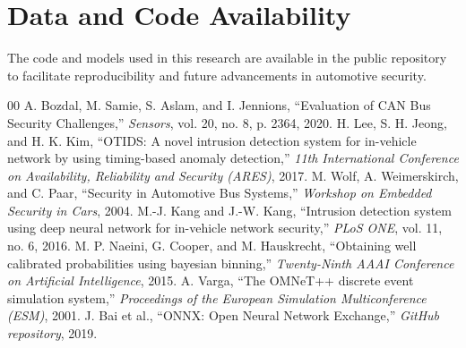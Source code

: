 \documentclass[conference]{IEEEtran}
\begin{document}
\section{Data and Code Availability}
The code and models used in this research are available in the public repository to facilitate reproducibility and future advancements in automotive security.

\begin{thebibliography}{00}
 A. Bozdal, M. Samie, S. Aslam, and I. Jennions, ``Evaluation of CAN Bus Security Challenges,'' \emph{Sensors}, vol. 20, no. 8, p. 2364, 2020.
 H. Lee, S. H. Jeong, and H. K. Kim, ``OTIDS: A novel intrusion detection system for in-vehicle network by using timing-based anomaly detection,'' \emph{11th International Conference on Availability, Reliability and Security (ARES)}, 2017.
 M. Wolf, A. Weimerskirch, and C. Paar, ``Security in Automotive Bus Systems,'' \emph{Workshop on Embedded Security in Cars}, 2004.
 M.-J. Kang and J.-W. Kang, ``Intrusion detection system using deep neural network for in-vehicle network security,'' \emph{PLoS ONE}, vol. 11, no. 6, 2016.
 M. P. Naeini, G. Cooper, and M. Hauskrecht, ``Obtaining well calibrated probabilities using bayesian binning,'' \emph{Twenty-Ninth AAAI Conference on Artificial Intelligence}, 2015.
 A. Varga, ``The OMNeT++ discrete event simulation system,'' \emph{Proceedings of the European Simulation Multiconference (ESM)}, 2001.
 J. Bai et al., ``ONNX: Open Neural Network Exchange,'' \emph{GitHub repository}, 2019.
\end{thebibliography}
\end{document}
